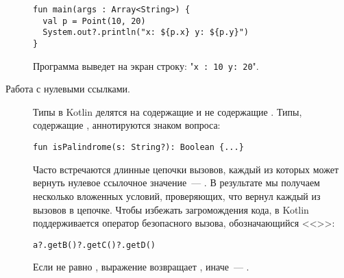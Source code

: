\begin{description}
\begin{code}
\begin{lstlisting}
fun main(args : Array<String>) {
  val p = Point(10, 20)
  System.out?.println("x: ${p.x} y: ${p.y}")
}
\end{lstlisting}
	Программа выведет на экран строку: "\texttt{x : 10 y: 20}".
\end{code}
	\item[Работа с нулевыми ссылками.] Типы в Kotlin делятся на содержащие  и не содержащие . Типы, содержащие , аннотируются знаком вопроса:
\begin{code}\begin{lstlisting}
fun isPalindrome(s: String?): Boolean {...}
\end{lstlisting}\end{code}

Часто встречаются длинные цепочки вызовов, каждый из которых может вернуть нулевое ссылочное значение~--- . В результате мы получаем несколько вложенных условий, проверяющих, что вернул каждый из вызовов в цепочке. Чтобы избежать загромождения кода, в Kotlin поддерживается оператор безопасного вызова, обозначающийся <<>>:
\begin{code}\begin{lstlisting}
a?.getB()?.getC()?.getD()
\end{lstlisting}\end{code}
Если  не равно , выражение  возвращает , иначе~--- .

\end{description}